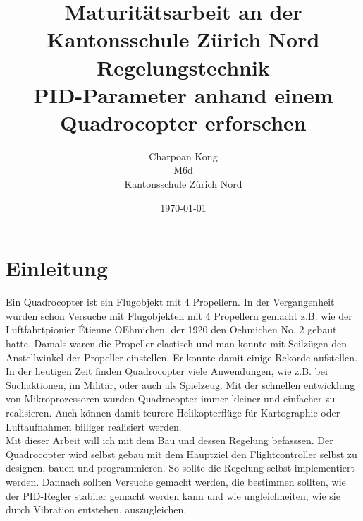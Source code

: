 \documentclass[12pt,a4paper, ngerman]{article}
\begin{document}
\title{\large Maturitätsarbeit an der Kantonsschule Zürich Nord \\ \Huge Regelungstechnik \\ \huge PID-Parameter anhand einem Quadrocopter erforschen}
\date{\today}
\author{Charpoan Kong \\ M6d \\ Kantonsschule Zürich Nord}
\maketitle
{}





\newpage
\clearpage
{}
\tableofcontents
\newpage
{}

\section{Einleitung}
Ein Quadrocopter ist ein Flugobjekt mit 4 Propellern. In der Vergangenheit wurden schon Versuche mit Flugobjekten mit 4 Propellern gemacht z.B. wie der Luftfahrtpionier Étienne OEhmichen. der 1920 den Oehmichen No. 2 gebaut hatte. Damals waren die Propeller elastisch und man konnte mit Seilzügen den Anstellwinkel der Propeller einstellen. Er konnte damit einige Rekorde aufstellen.\cite{website:Wikipedia_Quadrocopter}\\

In der heutigen Zeit finden Quadrocopter viele Anwendungen, wie z.B. bei Suchaktionen, im Militär, oder auch als Spielzeug. Mit der schnellen entwicklung von Mikroprozessoren wurden Quadrocopter immer kleiner und einfacher zu realisieren. Auch können damit teurere Helikopterflüge für Kartographie oder Luftaufnahmen billiger realisiert werden.\\

Mit dieser Arbeit will ich mit dem Bau und dessen Regelung befasssen. Der Quadrocopter wird selbst gebau mit dem Hauptziel den Flightcontroller selbst zu designen, bauen und programmieren. So sollte die Regelung selbst implementiert werden. Dannach sollten Versuche gemacht werden, die bestimmen sollten, wie der PID-Regler stabiler gemacht werden kann und wie ungleichheiten, wie sie durch Vibration entstehen, auszugleichen.
\newpage
\end{document}
